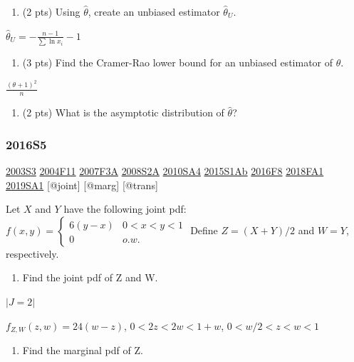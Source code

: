 \documentclass[6pt,twocolumn,Portrait]{article}
\providecommand{\tightlist}{%
  \setlength{\itemsep}{0pt}\setlength{\parskip}{0pt}}
\begin{document}
\begin{enumerate}
\def\labelenumi{(\alph{enumi})}
\setcounter{enumi}{1}
\tightlist
\item
  (2 pts) Using \(\hat\theta\), create an unbiased estimator
  \(\hat\theta_U\).
\end{enumerate}

\(\hat\theta_U=-\frac{n-1}{\sum\ln x_i}-1\)

\begin{enumerate}
\def\labelenumi{(\alph{enumi})}
\setcounter{enumi}{2}
\tightlist
\item
  (3 pts) Find the Cramer-Rao lower bound for an unbiased estimator of
  \(\theta\).
\end{enumerate}

\(\frac{(\theta+1)^2}{n}\)

\begin{enumerate}
\def\labelenumi{(\alph{enumi})}
\setcounter{enumi}{3}
\tightlist
\item
  (2 pts) What is the asymptotic distribution of \(\hat\theta\)?
\end{enumerate}

\hypertarget{s5-4}{%
\subsubsection{2016S5}\label{s5-4}}

\protect\hyperlink{s3}{2003S3} \protect\hyperlink{f11}{2004F11}
\protect\hyperlink{f3a}{2007F3A} \protect\hyperlink{s2a}{2008S2A}
\protect\hyperlink{sa4-1}{2010SA4} \protect\hyperlink{s1ab}{2015S1Ab}
\protect\hyperlink{f8-4}{2016F8} \protect\hyperlink{fa1-4}{2018FA1}
\protect\hyperlink{sa1-3}{2019SA1} {[}@joint{]} {[}@marg{]} {[}@trans{]}

Let \(X\) and \(Y\) have the following joint pdf:
\(f(x,y) =\begin{cases}6(y-x)& 0<x<y<1\\0& o.w.\end{cases}\) Define
\(Z=(X+Y)/2\) and \(W=Y\), respectively.

\begin{enumerate}
\def\labelenumi{(\alph{enumi})}
\tightlist
\item
  Find the joint pdf of Z and W.
\end{enumerate}

\(|J=2|\)

\(f_{Z,W}(z,w)=24(w-z)\), \(0<2z<2w<1+w\), \(0<w/2<z<w<1\)

\begin{enumerate}
\def\labelenumi{(\alph{enumi})}
\setcounter{enumi}{1}
\tightlist
\item
  Find the marginal pdf of Z.
\end{enumerate}
\end{document}

